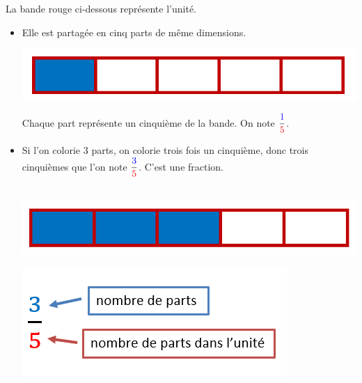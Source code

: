 \documentclass[12pt,a4paper]{article}
\begin{document}
\begin{myex}
	
	La bande rouge ci-dessous représente l'unité.
	
	\begin{itemize}
		\item Elle est partagée en cinq parts de même dimensions.
		
		\begin{center}
			\includegraphics[scale=0.42]{partage_1}
		\end{center}
	
		Chaque part représente un cinquième de la bande. On note $\dfrac{\textcolor{blue}{1}}{\textcolor{red}{5}}$.
		
		\item Si l'on colorie 3 parts, on colorie trois fois un cinquième, donc trois cinquièmes que l'on note $\dfrac{\textcolor{blue}{3}}{\textcolor{red}{5}}$. C'est une fraction.
		
		\begin{center}
			
			\begin{multicols}{2}
				
				\ \\
					
				\includegraphics[scale=0.42]{partage_2}
				
				
				
				\includegraphics[scale=0.72]{exemple1}
			\end{multicols}
			
		\end{center}
	\end{itemize}
	
\end{myex}
\end{document}
